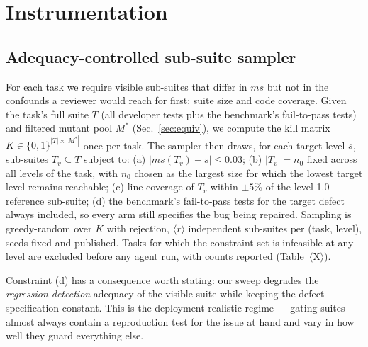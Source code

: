 \documentclass[conference]{IEEEtran}
\newcommand{\PH}[1]{\colorbox{gray!18}{\small$\langle$#1$\rangle$}}
\newcommand{\ms}{\ensuremath{\mathit{ms}}}
\begin{document}
\section{Instrumentation}\label{sec:instrument}

\subsection{Adequacy-controlled sub-suite sampler}\label{sec:sampler}
For each task we require visible sub-suites that differ in \ms{} but not
in the confounds a reviewer would reach for first: suite size and code
coverage. Given the task's full suite $T$ (all developer tests plus the
benchmark's fail-to-pass tests) and filtered mutant pool $M^\ast$
(Sec.~\ref{sec:equiv}), we compute the kill matrix
$K \in \{0,1\}^{|T| \times |M^\ast|}$ once per task. The sampler then
draws, for each target level $s$, sub-suites $T_v \subseteq T$ subject to:
(a) $|\ms(T_v) - s| \le 0.03$; (b) $|T_v| = n_0$ fixed across all levels
of the task, with $n_0$ chosen as the largest size for which the lowest
target level remains reachable; (c) line coverage of $T_v$ within
$\pm 5$\% of the level-1.0 reference sub-suite; (d) the benchmark's
fail-to-pass tests for the target defect always included, so every arm
still specifies the bug being repaired. Sampling is greedy-random over
$K$ with rejection, \PH{$r$} independent sub-suites per (task, level),
seeds fixed and published. Tasks for which the constraint set is
infeasible at any level are excluded before any agent run, with counts
reported (Table~\PH{X}).

Constraint (d) has a consequence worth stating: our sweep degrades the
\emph{regression-detection} adequacy of the visible suite while keeping
the defect specification constant. This is the deployment-realistic
regime --- gating suites almost always contain a reproduction test for
the issue at hand and vary in how well they guard everything else.
\end{document}
